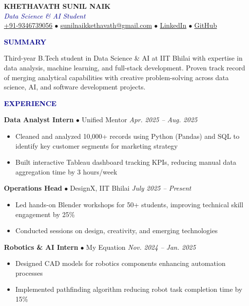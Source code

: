 \documentclass[11pt]{article}
\newcommand{\sectionheading}[1]{
  {\textbf{\textcolor{darkblue}{\large #1}}}
  \vspace{2pt}
}
\newcommand{\itemspace}{\vspace{2pt}}
\begin{document}
\begin{center}
  \textbf{\Large KHETHAVATH SUNIL NAIK} \\
  \textcolor{darkblue}{\textit{Data Science \& AI Student}} \\
  \vspace{4pt}
  \href{tel:+919346739056}{+91-9346739056} $\bullet$ 
  \href{mailto:sunilnaikkethavath@gmail.com}{sunilnaikkethavath@gmail.com} $\bullet$ 
  \href{https://linkedin.com/in/khethavath-sunil-naik-79a618237/}{LinkedIn} $\bullet$ 
  \href{https://github.com/Sunil0012}{GitHub}
\end{center}
\vspace{4pt}

\sectionheading{SUMMARY}
Third-year B.Tech student in Data Science \& AI at IIT Bhilai with expertise in data analysis, machine learning, and full-stack development. Proven track record of merging analytical capabilities with creative problem-solving across data science, AI, and software development projects.
\vspace{6pt}

\sectionheading{EXPERIENCE}
\noindent \textbf{Data Analyst Intern} $\bullet$ Unified Mentor \hfill \textit{Apr. 2025 -- Aug. 2025} \\
\begin{itemize}[leftmargin=15pt]
  \itemspace \item Cleaned and analyzed 10,000+ records using Python (Pandas) and SQL to identify key customer segments for marketing strategy
  \itemspace \item Built interactive Tableau dashboard tracking KPIs, reducing manual data aggregation time by 3 hours/week
\end{itemize}

\noindent \textbf{Operations Head} $\bullet$ DesignX, IIT Bhilai \hfill \textit{July 2025 -- Present} \\
\begin{itemize}[leftmargin=15pt]
  \itemspace \item Led hands-on Blender workshops for 50+ students, improving technical skill engagement by 25\%
  \itemspace \item Conducted sessions on design, creativity, and emerging technologies
\end{itemize}

\noindent \textbf{Robotics \& AI Intern} $\bullet$ My Equation \hfill \textit{Nov. 2024 -- Jan. 2025} \\
\begin{itemize}[leftmargin=15pt]
  \itemspace \item Designed CAD models for robotics components enhancing automation processes
  \itemspace \item Implemented pathfinding algorithm reducing robot task completion time by 15\%
\end{itemize}
\vspace{4pt}
\end{document}
